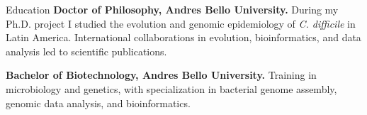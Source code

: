 \begin{rubric}{Education}
\entry*[2018 -- 2023]%
	\textbf{Doctor of Philosophy, Andres Bello University.}
	During my Ph.D. project I studied the evolution and genomic epidemiology of \emph{C. difficile} in Latin America. International collaborations in evolution, bioinformatics, and data analysis led to scientific publications.

\entry*[2012 -- 2016]%
	\textbf{Bachelor of Biotechnology, Andres Bello University.}
	Training in microbiology and genetics, with specialization in bacterial genome assembly, genomic data analysis, and bioinformatics.
\end{rubric}
